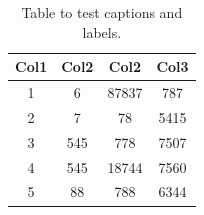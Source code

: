 \begin{table}[tbh!]
\caption{Table to test captions and labels.\label{tab:example}}
\centering
\begin{tabular}{|c c c c|}
 \hline
 Col1 & Col2 & Col2 & Col3 \\ [0.5ex]
 \hline\hline
 1 & 6 & 87837 & 787 \\
 2 & 7 & 78 & 5415 \\
 3 & 545 & 778 & 7507 \\
 4 & 545 & 18744 & 7560 \\
 5 & 88 & 788 & 6344 \\ [1ex]
 \hline
\end{tabular}
\end{table}
